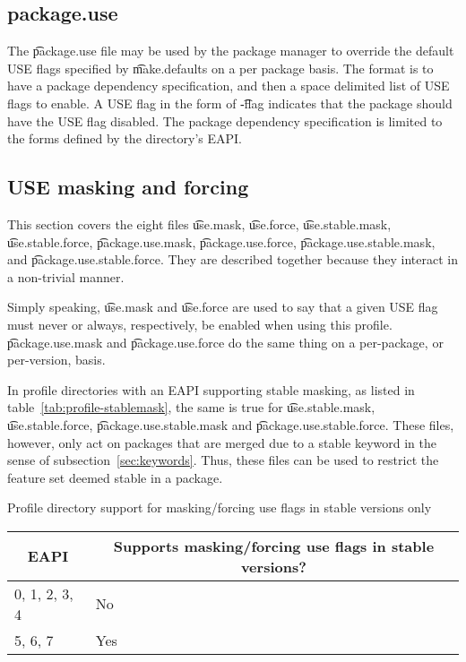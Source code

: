 \subsection{package.use}
The \t{package.use} file may be used by the package manager to override the default USE flags specified
by \t{make.defaults} on a per package basis.  The format is to have a package dependency specification,
and then a space delimited list of USE flags to enable.  A USE flag in the form of \t{-flag} indicates
that the package should have the USE flag disabled.  The package dependency specification is limited to
the forms defined by the directory's EAPI.

\subsection{USE masking and forcing}
\label{sec:use-masking}
This section covers the eight files \t{use.mask}, \t{use.force}, \t{use.stable.mask},
\t{use.stable.force}, \t{package.use.mask}, \t{package.use.force}, \t{package.use.stable.mask},
and \t{package.use.\allowbreak stable.force}. They are described together because they interact in
a non-trivial manner.

Simply speaking, \t{use.mask} and \t{use.force} are used to say that a given USE flag must never or
always, respectively, be enabled when using this profile. \t{package.use.mask} and
\t{package.use.force} do the same thing on a per-package, or per-version, basis.

In profile directories with an EAPI supporting stable masking, as listed in
table~\ref{tab:profile-stablemask}, the same is true for \t{use.stable.mask}, \t{use.stable.force},
\t{package.use.stable.mask} and \t{package.use.\allowbreak stable.force}. These files, however,
only act on packages that are merged due to a stable keyword in the sense of
subsection~\ref{sec:keywords}. Thus, these files can be used to restrict the feature set deemed
stable in a package.

\begin{centertable}{Profile directory support for masking/forcing use flags in stable versions only}
    \label{tab:profile-stablemask}
    \begin{tabular}{ll}
      \toprule
      \multicolumn{1}{c}{\textbf{EAPI}} &
      \multicolumn{1}{c}{\textbf{Supports masking/forcing use flags in stable versions?}} \\
      \midrule
      0, 1, 2, 3, 4     & No  \\
      5, 6, 7           & Yes \\
      \bottomrule
    \end{tabular}
\end{centertable}

